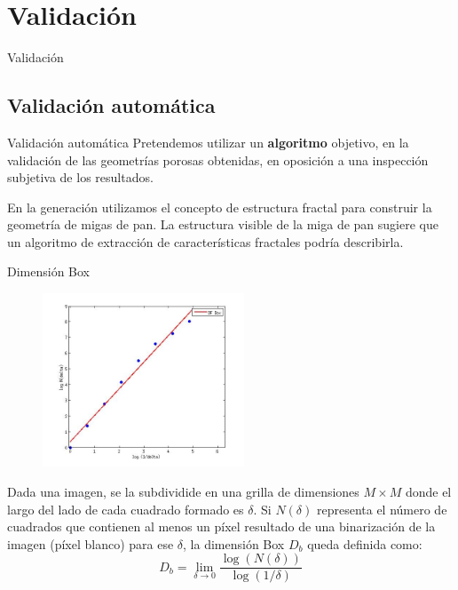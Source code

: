 \documentclass[spanish]{beamer}
\begin{document}
\section{Validación}



\begin{frame}
\begin{block}{}
\begin{center}
\vspace{1cm}
\huge{Validación}
\vspace{1cm}
\end{center}
\end{block}
\end{frame}


\subsection{Validación automática}

\begin{frame}{Validación automática}
Pretendemos utilizar un \textbf{algoritmo} objetivo, en la validación de las geometrías porosas obtenidas, en oposición a una inspección subjetiva de los resultados.

En la generación utilizamos el concepto de estructura fractal para construir la geometría de migas de pan.
La estructura visible de la miga de pan sugiere que un algoritmo de extracción de características fractales podría describirla.


\end{frame}

\begin{frame}{Dimensión Box}

\begin{figure}
\includegraphics[width=6cm]{../figures/fitbox}
\end{figure}

Dada una imagen, se la subdividide en una grilla de dimensiones $M\times M$ donde el largo del lado de cada cuadrado formado es $\delta$. Si $N(\delta)$ representa el n\'umero de cuadrados que contienen al menos un p\'ixel resultado de una binarizaci\'on de la imagen (p\'ixel blanco) para ese $\delta$, la dimensi\'on Box $D_{b}$ queda definida como:\\

$$D_{b} = \displaystyle\lim_{\delta \to 0}{\frac{\log(N(\delta))}{\log (1/\delta)}}$$


\end{frame}
\end{document}
